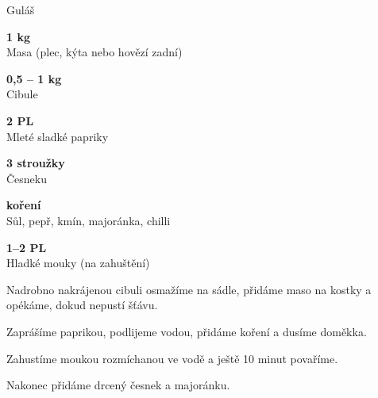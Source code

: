 \documentclass[11pt,a4paper]{article}
\begin{document}
\begin{recipe}[Mahogany]{Guláš}
    \begin{ingredients}
        \item \parbox[t]{\linewidth}{\raggedright \weight \textbf{1 kg}\\ Masa (plec, kýta nebo hovězí zadní)}
        \item \parbox[t]{\linewidth}{\raggedright \weight \textbf{0,5 -- 1 kg}\\ Cibule}
        \item \parbox[t]{\linewidth}{\raggedright \spoon \textbf{2 PL}\\ Mleté sladké papriky}
        \item \parbox[t]{\linewidth}{\raggedright \piece \textbf{3 stroužky}\\ Česneku}
        \item \parbox[t]{\linewidth}{\raggedright \indefinite \textbf{koření}\\ Sůl, pepř, kmín, majoránka, chilli}
        \item \parbox[t]{\linewidth}{\raggedright \spoon \textbf{1--2 PL}\\ Hladké mouky (na zahuštění)}
    \end{ingredients}
    \begin{steps}
        \item Nadrobno nakrájenou cibuli osmažíme na sádle, přidáme maso na kostky a opékáme, dokud nepustí šťávu.
        \item Zaprášíme paprikou, podlijeme vodou, přidáme koření a dusíme doměkka.
        \item Zahustíme moukou rozmíchanou ve vodě a ještě 10 minut povaříme.
        \item Nakonec přidáme drcený česnek a majoránku.
    \end{steps}
\end{recipe}

\end{document}
